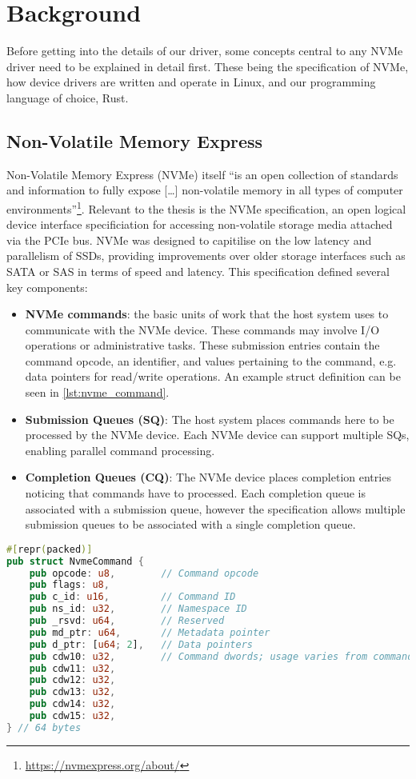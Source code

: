 \chapter{Background}\label{chapter:basics}

Before getting into the details of our driver, some concepts central to any NVMe driver need to be explained in detail first. These being the specification of NVMe, how device drivers are written and operate in Linux, and our programming language of choice, Rust.

\section{Non-Volatile Memory Express}
Non-Volatile Memory Express (NVMe) itself ``is an open collection of standards and information to fully expose [\ldots] non-volatile memory in all types of computer environments''\footnote{\url{https://nvmexpress.org/about/}}. Relevant to the thesis is the NVMe specification, an open logical device interface specificiation for accessing non-volatile storage media attached via the PCIe bus. NVMe was designed to capitilise on the low latency and parallelism of SSDs, providing improvements over older storage interfaces such as SATA or SAS in terms of speed and latency. This specification defined several key components:
\begin{itemize}
        \item \textbf{NVMe commands}: the basic units of work that the host system uses to communicate with the NVMe device. These commands may involve I/O operations or administrative tasks. These submission entries contain the command opcode, an identifier, and values pertaining to the command, e.g. data pointers for read/write operations. An example struct definition can be seen in \autoref{lst:nvme_command}.
        \item \textbf{Submission Queues (SQ)}: The host system places commands here to be processed by the NVMe device. Each NVMe device can support multiple SQs, enabling parallel command processing.
        \item \textbf{Completion Queues (CQ)}: The NVMe device places completion entries noticing that commands have to processed. Each completion queue is associated with a submission queue, however the specification allows multiple submission queues to be associated with a single completion queue.
\end{itemize}

\begin{lstlisting}[float,language=Rust,label=lst:nvme_command,caption=The minimal NVMe command defined as a struct in Rust]
#[repr(packed)]
pub struct NvmeCommand {
    pub opcode: u8,        // Command opcode
    pub flags: u8,
    pub c_id: u16,         // Command ID
    pub ns_id: u32,        // Namespace ID
    pub _rsvd: u64,        // Reserved
    pub md_ptr: u64,       // Metadata pointer
    pub d_ptr: [u64; 2],   // Data pointers
    pub cdw10: u32,        // Command dwords; usage varies from command to command
    pub cdw11: u32,
    pub cdw12: u32,
    pub cdw13: u32,
    pub cdw14: u32,
    pub cdw15: u32,
} // 64 bytes
\end{lstlisting}

